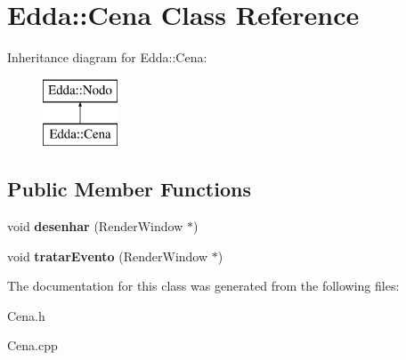 \hypertarget{class_edda_1_1_cena}{
\section{Edda::Cena Class Reference}
\label{class_edda_1_1_cena}
}
Inheritance diagram for Edda::Cena:\begin{figure}[H]
\begin{center}
\leavevmode
\includegraphics[height=2.000000cm]{class_edda_1_1_cena}
\end{center}
\end{figure}
\subsection*{Public Member Functions}
\begin{DoxyCompactItemize}
\item 
\hypertarget{class_edda_1_1_cena_aadddd43658f20231e2a4791c2c321c36}{
void {\bfseries desenhar} (RenderWindow $\ast$)}
\label{class_edda_1_1_cena_aadddd43658f20231e2a4791c2c321c36}

\item 
\hypertarget{class_edda_1_1_cena_a9b5584b195340f2992d2beea4cd36ca7}{
void {\bfseries tratarEvento} (RenderWindow $\ast$)}
\label{class_edda_1_1_cena_a9b5584b195340f2992d2beea4cd36ca7}

\end{DoxyCompactItemize}


The documentation for this class was generated from the following files:\begin{DoxyCompactItemize}
\item 
Cena.h\item 
Cena.cpp\end{DoxyCompactItemize}
